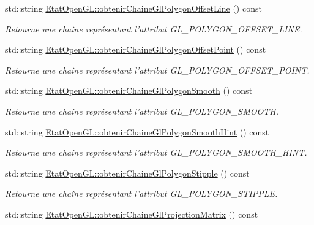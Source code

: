 \begin{DoxyCompactItemize}
std\-::string \hyperlink{group__utilitaire_ga7470a404bbcbef21d1316b3bfd02deb6}{Etat\-Open\-G\-L\-::obtenir\-Chaine\-Gl\-Polygon\-Offset\-Line} () const 
\begin{DoxyCompactList}\small\item\em Retourne une chaîne représentant l'attribut G\-L\-\_\-\-P\-O\-L\-Y\-G\-O\-N\-\_\-\-O\-F\-F\-S\-E\-T\-\_\-\-L\-I\-N\-E. \end{DoxyCompactList}\item 
std\-::string \hyperlink{group__utilitaire_ga19543110e1a7115a1ec9a30caaa490fe}{Etat\-Open\-G\-L\-::obtenir\-Chaine\-Gl\-Polygon\-Offset\-Point} () const 
\begin{DoxyCompactList}\small\item\em Retourne une chaîne représentant l'attribut G\-L\-\_\-\-P\-O\-L\-Y\-G\-O\-N\-\_\-\-O\-F\-F\-S\-E\-T\-\_\-\-P\-O\-I\-N\-T. \end{DoxyCompactList}\item 
std\-::string \hyperlink{group__utilitaire_gac4627c5f84f92d1e259d756aba7d6068}{Etat\-Open\-G\-L\-::obtenir\-Chaine\-Gl\-Polygon\-Smooth} () const 
\begin{DoxyCompactList}\small\item\em Retourne une chaîne représentant l'attribut G\-L\-\_\-\-P\-O\-L\-Y\-G\-O\-N\-\_\-\-S\-M\-O\-O\-T\-H. \end{DoxyCompactList}\item 
std\-::string \hyperlink{group__utilitaire_ga45100a9646aab1c37b538298c55cb0ca}{Etat\-Open\-G\-L\-::obtenir\-Chaine\-Gl\-Polygon\-Smooth\-Hint} () const 
\begin{DoxyCompactList}\small\item\em Retourne une chaîne représentant l'attribut G\-L\-\_\-\-P\-O\-L\-Y\-G\-O\-N\-\_\-\-S\-M\-O\-O\-T\-H\-\_\-\-H\-I\-N\-T. \end{DoxyCompactList}\item 
std\-::string \hyperlink{group__utilitaire_ga53fd366a5e9d6eef773c883b1d2914d5}{Etat\-Open\-G\-L\-::obtenir\-Chaine\-Gl\-Polygon\-Stipple} () const 
\begin{DoxyCompactList}\small\item\em Retourne une chaîne représentant l'attribut G\-L\-\_\-\-P\-O\-L\-Y\-G\-O\-N\-\_\-\-S\-T\-I\-P\-P\-L\-E. \end{DoxyCompactList}\item 
std\-::string \hyperlink{group__utilitaire_ga4e56c1c62378ae9385db874bf2b6a030}{Etat\-Open\-G\-L\-::obtenir\-Chaine\-Gl\-Projection\-Matrix} () const 

\end{DoxyCompactItemize}
